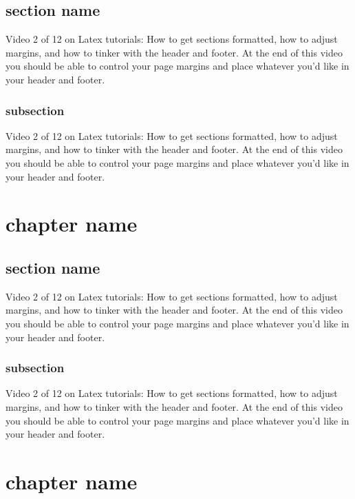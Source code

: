 \documentclass[12pt]{report}
\begin{document}
\section{section name}
Video 2 of 12 on Latex tutorials: How to get sections formatted, how to adjust margins, and how to tinker with the header and footer. At the end of this video you should be able to control your page margins and place whatever you'd like in your header and footer.
\subsection*{subsection}
Video 2 of 12 on Latex tutorials: How to get sections formatted, how to adjust margins, and how to tinker with the header and footer. At the end of this video you should be able to control your page margins and place whatever you'd like in your header and footer.

\chapter{chapter name}
\section{section name}
Video 2 of 12 on Latex tutorials: How to get sections formatted, how to adjust margins, and how to tinker with the header and footer. At the end of this video you should be able to control your page margins and place whatever you'd like in your header and footer.
\subsection*{subsection}
Video 2 of 12 on Latex tutorials: How to get sections formatted, how to adjust margins, and how to tinker with the header and footer. At the end of this video you should be able to control your page margins and place whatever you'd like in your header and footer.

\chapter{chapter name}
\end{document}
